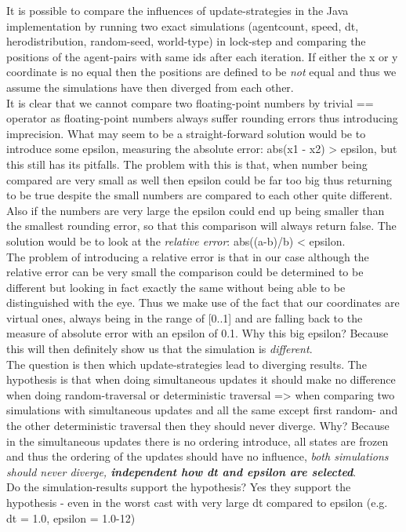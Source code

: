 It is possible to compare the influences of update-strategies in the Java implementation by running two exact simulations (agentcount, speed, dt, herodistribution, random-seed, world-type) in lock-step and comparing the positions of the agent-pairs with same ids after each iteration. If either the x or y coordinate is no equal then the positions are defined to be \textit{not} equal and thus we assume the simulations have then diverged from each other. \\
It is clear that we cannot compare two floating-point numbers by trivial == operator as floating-point numbers always suffer rounding errors thus introducing imprecision. What may seem to be a straight-forward solution would be to introduce some epsilon, measuring the absolute error: abs(x1 - x2) > epsilon, but this still has its pitfalls. The problem with this is that, when number being compared are very small as well then epsilon could be far too big thus returning to be true despite the small numbers are compared to each other quite different. Also if the numbers are very large the epsilon could end up being smaller than the smallest rounding error, so that this comparison will always return false. The solution would be to look at the \textit{relative error}: abs((a-b)/b) < epsilon. \\
The problem of introducing a relative error is that in our case although the relative error can be very small the comparison could be determined to be different but looking in fact exactly the same without being able to be distinguished with the eye. Thus we make use of the fact that our coordinates are virtual ones, always being in the range of [0..1] and are falling back to the measure of absolute error with an epsilon of 0.1. Why this big epsilon? Because this will then definitely show us that the simulation is \textit{different}. \\

The question is then which update-strategies lead to diverging results. The hypothesis is that when doing simultaneous updates it should make no difference when doing random-traversal or deterministic traversal => when comparing two simulations with simultaneous updates and all the same except first random- and the other deterministic traversal then they should never diverge. Why? Because in the simultaneous updates there is no ordering introduce, all states are frozen and thus the ordering of the updates should have no influence, \textit{both simulations should never diverge, \textbf{independent how dt and epsilon are selected}}. \\
Do the simulation-results support the hypothesis? Yes they support the hypothesis - even in the worst cast with very large dt compared to epsilon (e.g. dt = 1.0, epsilon = 1.0-12)

